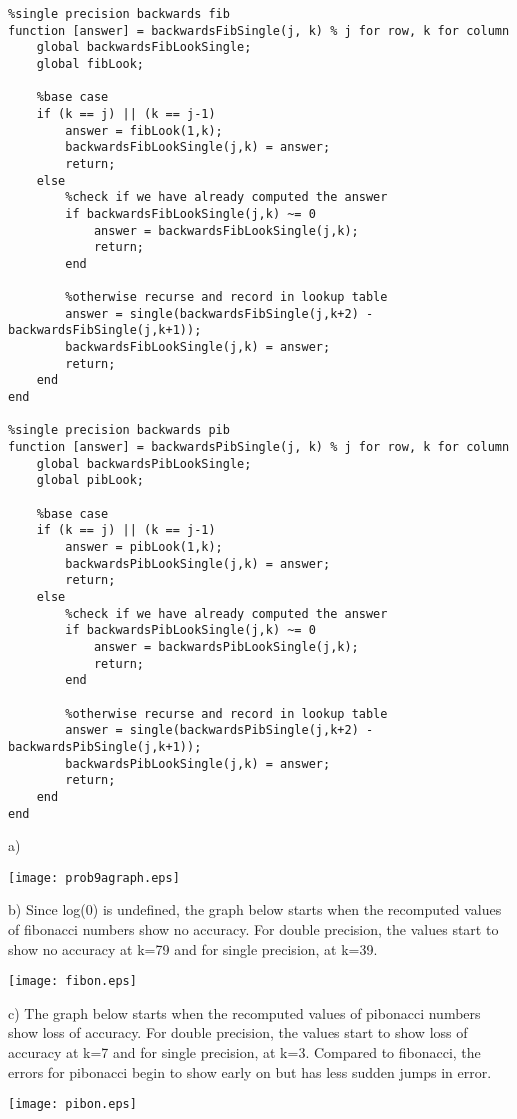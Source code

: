 \documentclass{article}
\begin{document}
\begin{lstlisting}
%single precision backwards fib
function [answer] = backwardsFibSingle(j, k) % j for row, k for column
    global backwardsFibLookSingle;
    global fibLook;
    
    %base case
    if (k == j) || (k == j-1)
        answer = fibLook(1,k);
        backwardsFibLookSingle(j,k) = answer;
        return;
    else
        %check if we have already computed the answer
        if backwardsFibLookSingle(j,k) ~= 0
            answer = backwardsFibLookSingle(j,k);
            return;
        end
        
        %otherwise recurse and record in lookup table
        answer = single(backwardsFibSingle(j,k+2) - backwardsFibSingle(j,k+1));
        backwardsFibLookSingle(j,k) = answer;
        return;
    end
end

%single precision backwards pib
function [answer] = backwardsPibSingle(j, k) % j for row, k for column
    global backwardsPibLookSingle;
    global pibLook;
    
    %base case
    if (k == j) || (k == j-1)
        answer = pibLook(1,k);
        backwardsPibLookSingle(j,k) = answer;
        return;
    else
        %check if we have already computed the answer
        if backwardsPibLookSingle(j,k) ~= 0
            answer = backwardsPibLookSingle(j,k);
            return;
        end
        
        %otherwise recurse and record in lookup table
        answer = single(backwardsPibSingle(j,k+2) - backwardsPibSingle(j,k+1));
        backwardsPibLookSingle(j,k) = answer;
        return;
    end
end

\end{lstlisting}


\newpage
a)
\begin{center}
\texttt{[image: prob9agraph.eps]}
\end{center}
b) Since log(0) is undefined, the graph below starts when the recomputed values of fibonacci numbers show no accuracy. For double precision, the values start to show no accuracy at k=79 and for single precision,  at k=39.
\begin{center}
\texttt{[image: fibon.eps]}
\end{center}
c) The graph below starts when the recomputed values of pibonacci numbers show loss of accuracy. For double precision, the values start to show loss of accuracy at k=7 and for single precision, at k=3. Compared to fibonacci, the errors for pibonacci begin to show early on but has less sudden jumps in error.  
\begin{center}
\texttt{[image: pibon.eps]}
\end{center}
\end{document}
